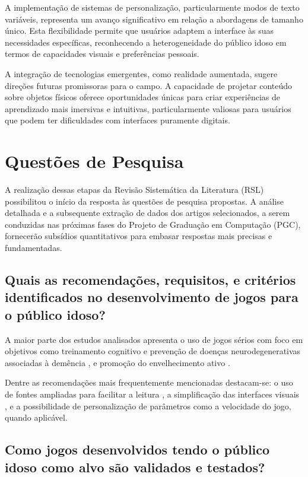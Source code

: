 A implementação de sistemas de personalização, particularmente modos de texto variáveis, representa um avanço significativo em relação a abordagens de tamanho único. Esta flexibilidade permite que usuários adaptem a interface às suas necessidades específicas, reconhecendo a heterogeneidade do público idoso em termos de capacidades visuais e preferências pessoais.

A integração de tecnologias emergentes, como realidade aumentada, sugere direções futuras promissoras para o campo. A capacidade de projetar conteúdo sobre objetos físicos oferece oportunidades únicas para criar experiências de aprendizado mais imersivas e intuitivas, particularmente valiosas para usuários que podem ter dificuldades com interfaces puramente digitais.

\section{Questões de Pesquisa}\label{sec:qp}

A realização dessas etapas da Revisão Sistemática da Literatura (RSL) possibilitou o início da resposta às questões de pesquisa propostas. A análise detalhada e a subsequente extração de dados dos artigos selecionados, a serem conduzidas nas próximas fases do Projeto de Graduação em Computação (PGC), fornecerão subsídios quantitativos para embasar respostas mais precisas e fundamentadas.

\subsection{Quais as recomendações, requisitos, e critérios identificados no desenvolvimento de jogos para o público idoso?}\label{subsec:qp1}

A maior parte dos estudos analisados apresenta o uso de jogos sérios com foco em objetivos como treinamento cognitivo e prevenção de doenças neurodegenerativas associadas à demência \cite{yang2024serious, zuo2024development, caggianese2018towards}, e promoção do envelhecimento ativo \cite{nacimiento-garcia2024gamification}.

Dentre as recomendações mais frequentemente mencionadas destacam-se: o uso de fontes ampliadas para facilitar a leitura \cite{tziraki2017designing}, a simplificação das interfaces visuais \cite{valladares2017design}, e a possibilidade de personalização de parâmetros como a velocidade do jogo, quando aplicável.

\subsection{Como jogos desenvolvidos tendo o público idoso como alvo são validados e testados?}\label{subsec:qp2}

